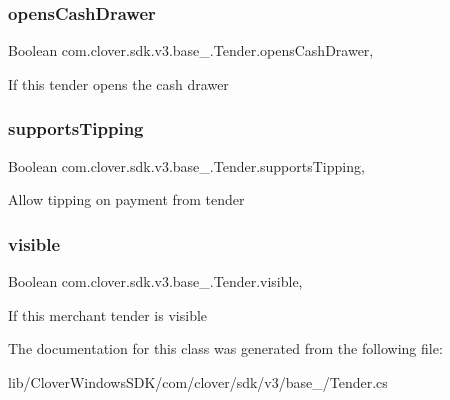 \subsubsection{\texorpdfstring{opens\+Cash\+Drawer}{opensCashDrawer}}
{\footnotesize\ttfamily Boolean com.\+clover.\+sdk.\+v3.\+base\+\_\+.\+Tender.\+opens\+Cash\+Drawer\hspace{0.3cm}{\ttfamily [get]}, {\ttfamily [set]}}



If this tender opens the cash drawer 

\mbox{\label{classcom_1_1clover_1_1sdk_1_1v3_1_1base___1_1_tender_a908bac8871d58d1cc29f5ca1c8a022cc}} 
\subsubsection{\texorpdfstring{supports\+Tipping}{supportsTipping}}
{\footnotesize\ttfamily Boolean com.\+clover.\+sdk.\+v3.\+base\+\_\+.\+Tender.\+supports\+Tipping\hspace{0.3cm}{\ttfamily [get]}, {\ttfamily [set]}}



Allow tipping on payment from tender 

\mbox{\label{classcom_1_1clover_1_1sdk_1_1v3_1_1base___1_1_tender_ad1d373010d994888c0fda0e9b4a1f206}} 
\subsubsection{\texorpdfstring{visible}{visible}}
{\footnotesize\ttfamily Boolean com.\+clover.\+sdk.\+v3.\+base\+\_\+.\+Tender.\+visible\hspace{0.3cm}{\ttfamily [get]}, {\ttfamily [set]}}



If this merchant tender is visible 



The documentation for this class was generated from the following file\+:\begin{DoxyCompactItemize}
\item 
lib/\+Clover\+Windows\+S\+D\+K/com/clover/sdk/v3/base\+\_\+/Tender.\+cs\end{DoxyCompactItemize}
